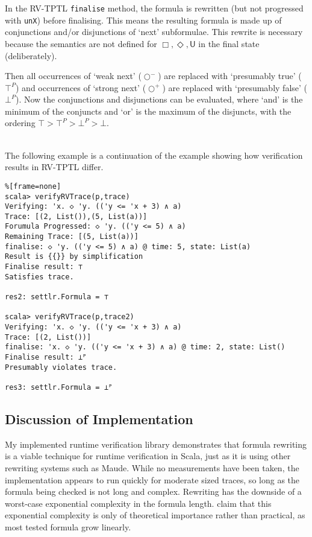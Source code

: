 \documentclass[a4paper]{article}
\newcommand{\U}{\mathsf{U}}
\newcommand{\sn}{\bigcirc^+}
\newcommand{\wn}{\bigcirc^-}
\begin{document}
In the RV-TPTL \texttt{finalise} method, the formula is rewritten (but not progressed with \texttt{unX}) before finalising. This means the resulting formula is made up of conjunctions and/or disjunctions of `next' subformulae. This rewrite is necessary because the semantics are not defined for $\Box,\Diamond,\U$ in the final state (deliberately).

Then all occurrences of `weak next' ($\wn$) are replaced with `presumably true' ($\top^P$) and occurrences of `strong next' ($\sn$) are replaced with `presumably false' ($\bot^P$). Now the conjunctions and disjunctions can be evaluated, where `and' is the minimum of the conjuncts and `or' is the maximum of the disjuncts, with the ordering $\top>\top^P>\bot^P>\bot$.

\begin{eg}~\\
  The following example is a continuation of the  example showing how verification results in RV-TPTL differ.
\begin{lstlisting}%[frame=none]
scala> verifyRVTrace(p,trace)
Verifying: 'x. ◇ 'y. (('y <= 'x + 3) ∧ a)
Trace: [(2, List()),(5, List(a))]
Forumula Progressed: ◇ 'y. (('y <= 5) ∧ a)
Remaining Trace: [(5, List(a))]
finalise: ◇ 'y. (('y <= 5) ∧ a) @ time: 5, state: List(a)
Result is {{}} by simplification
Finalise result: ⊤
Satisfies trace.

res2: settlr.Formula = ⊤

scala> verifyRVTrace(p,trace2)
Verifying: 'x. ◇ 'y. (('y <= 'x + 3) ∧ a)
Trace: [(2, List())]
finalise: 'x. ◇ 'y. (('y <= 'x + 3) ∧ a) @ time: 2, state: List()
Finalise result: ⊥ᴾ
Presumably violates trace.

res3: settlr.Formula = ⊥ᴾ
\end{lstlisting}
\end{eg}

\subsection{Discussion of Implementation}
My implemented runtime verification library demonstrates that formula rewriting is a viable technique for runtime verification in Scala, just as it is using other rewriting systems such as Maude. While no measurements have been taken, the implementation appears to run quickly for moderate sized traces, so long as the formula being checked is not long and complex. Rewriting has the downside of a worst-case exponential complexity in the formula length. \textcite[178]{rosu2005rewriting} claim that this exponential complexity is only of theoretical importance rather than practical, as most tested formula grow linearly.
\end{document}
